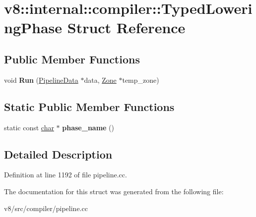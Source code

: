 \hypertarget{structv8_1_1internal_1_1compiler_1_1TypedLoweringPhase}{}\section{v8\+:\+:internal\+:\+:compiler\+:\+:Typed\+Lowering\+Phase Struct Reference}
\label{structv8_1_1internal_1_1compiler_1_1TypedLoweringPhase}
\subsection*{Public Member Functions}
\begin{DoxyCompactItemize}
\item 
\mbox{\label{structv8_1_1internal_1_1compiler_1_1TypedLoweringPhase_a96b4962cb54b4166764164b8308c9d3f}} 
void {\bfseries Run} (\mbox{\hyperlink{classv8_1_1internal_1_1compiler_1_1PipelineData}{Pipeline\+Data}} $\ast$data, \mbox{\hyperlink{classv8_1_1internal_1_1Zone}{Zone}} $\ast$temp\+\_\+zone)
\end{DoxyCompactItemize}
\subsection*{Static Public Member Functions}
\begin{DoxyCompactItemize}
\item 
\mbox{\label{structv8_1_1internal_1_1compiler_1_1TypedLoweringPhase_ab952c3c9cbfcf376efe31dec108d313c}} 
static const \mbox{\hyperlink{classchar}{char}} $\ast$ {\bfseries phase\+\_\+name} ()
\end{DoxyCompactItemize}


\subsection{Detailed Description}


Definition at line 1192 of file pipeline.\+cc.



The documentation for this struct was generated from the following file\+:\begin{DoxyCompactItemize}
\item 
v8/src/compiler/pipeline.\+cc\end{DoxyCompactItemize}
